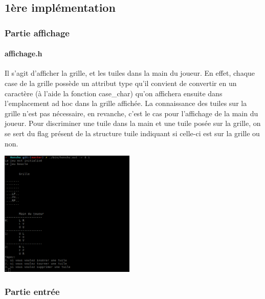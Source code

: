 \documentclass[10pt]{article}
\begin{document}
  \subsection{1ère implémentation}
  \subsubsection{Partie affichage}
        \paragraph{affichage.h}
      Il s'agit d'afficher la grille, et les tuiles dans la main du joueur. 
      En effet, chaque case de la grille possède un attribut type qu'il convient
      de convertir en un caractère (à l'aide la fonction case\_char) qu'on affichera ensuite dans
      l'emplacement ad hoc dans la grille affichée.
      La connaissance des tuiles sur la grille n'est pas nécessaire, en revanche, c'est le cas pour l'affichage
      de la main du joueur. Pour discriminer une tuile dans la main et une tuile posée sur la grille, 
      on se sert du flag présent de la structure tuile indiquant si celle-ci est sur la grille ou non.
      \begin{center}
	\includegraphics[height=6cm,keepaspectratio]{../images/grille_standart.png}
      \end{center}
      
  \subsubsection{Partie entrée}
\end{document}

